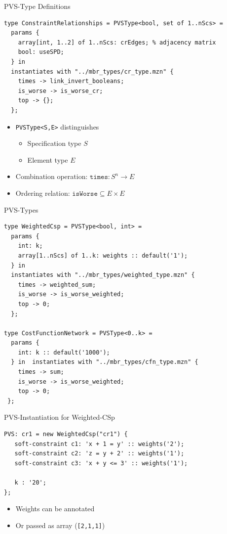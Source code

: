 \begin{frame}[fragile]{PVS-Type Definitions}
\begin{lstlisting}
type ConstraintRelationships = PVSType<bool, set of 1..nScs> = 
  params { 
    array[int, 1..2] of 1..nScs: crEdges; % adjacency matrix
    bool: useSPD;
  } in 
  instantiates with "../mbr_types/cr_type.mzn" {
    times -> link_invert_booleans;
    is_worse -> is_worse_cr;
    top -> {};
  };
\end{lstlisting}
\begin{itemize}
\item \texttt{PVSType<S,E>} distinguishes
\begin{itemize}
\item[] Specification type $S$ 
\item[] Element type $E$
\end{itemize} 
\item Combination operation: $\mathtt{times} : S^n \to E$
\item Ordering relation: $\mathtt{isWorse} \subseteq E \times E$
\end{itemize}
\end{frame}

\begin{frame}[fragile]{PVS-Types}
\begin{lstlisting}
type WeightedCsp = PVSType<bool, int> = 
  params {
    int: k; 
    array[1..nScs] of 1..k: weights :: default('1');
  } in  
  instantiates with "../mbr_types/weighted_type.mzn" {
    times -> weighted_sum;
    is_worse -> is_worse_weighted;
    top -> 0;
  };
  
type CostFunctionNetwork = PVSType<0..k> = 
  params {
    int: k :: default('1000'); 
  } in  instantiates with "../mbr_types/cfn_type.mzn" {
    times -> sum;
    is_worse -> is_worse_weighted; 
    top -> 0;
 };
\end{lstlisting}
\end{frame}

\begin{frame}[fragile]{PVS-Instantiation for Weighted-CSp}
\begin{lstlisting}
PVS: cr1 = new WeightedCsp("cr1") {
   soft-constraint c1: 'x + 1 = y' :: weights('2');
   soft-constraint c2: 'z = y + 2' :: weights('1');
   soft-constraint c3: 'x + y <= 3' :: weights('1');
   
   k : '20';
}; 
\end{lstlisting}
\begin{itemize}
\item Weights can be annotated 
\item Or passed as array (\texttt{[2,1,1]}) %
\end{itemize}
\end{frame}


